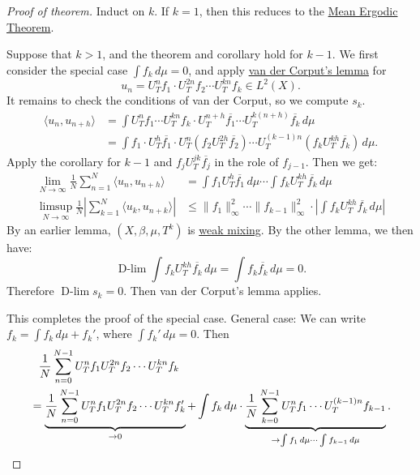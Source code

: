 \documentclass{article}
\DeclareMathOperator*{\dlim}{D-lim}
\begin{document}
\begin{proof}[Proof of theorem]
  Induct on $k$.
  If $k=1$, then this reduces to the \hyperlink{thm:meanet}{Mean Ergodic Theorem}.

  Suppose that $k > 1$, and the theorem and corollary hold for $k-1$.
  We first consider the special case $\int f_k \, d\mu = 0$, and apply \hyperlink{lem:vdC}{van der Corput's lemma} for
  \begin{equation*}
    u_n = U_T^n f_1 \cdot U_T^{2n} f_2 \dotsm U_T^{kn} f_k \in L^2(X).
  \end{equation*}
  It remains to check the conditions of van der Corput, so we compute $s_k$.
  \begin{align*}
    \langle u_n, u_{n+h} \rangle &= \int U_T^n f_1 \dotsm U_T^{kn} f_k \cdot U_T^{n+h} \overline{f_1} \dotsm U_T^{k(n+h)} \overline{f_k} \, d\mu \\
                                 &= \int f_1 \cdot U_T^h \overline{f_1} \cdot U_T^n(f_2 U_T^{2h} \overline{f_2}) \dotsm U_T^{(k-1) n} (f_k U_T^{kh} \overline{f_k}) \, d\mu.
  \end{align*}
  Apply the corollary for $k-1$ and $f_j U_T^{jk} \overline{f_j}$ in the role of $f_{j-1}$.
  Then we get:
  \begin{align*}
    \lim_{N \to \infty} \frac{1}{N} \sum_{n=1}^N \langle u_n, u_{n+h} \rangle &= \int f_1 U_T^h \overline{f_1} \, d\mu \dotsm \int f_k U_T^{kh} \overline{f_k} \, d\mu \\
    \limsup_{N \to \infty} \frac{1}{N} \left|\sum_{k=1}^N \langle u_k, u_{n+k} \rangle \right| &\leq \|f_1\|^2_\infty \dotsm \|f_{k-1}\|^2_\infty \cdot \left|\int f_k U_T^{kh} \overline{f_k} \, d\mu\right|
  \end{align*}
  By an earlier lemma, $(X, \beta, \mu, T^k)$ is \hyperlink{def:wMixing}{weak mixing}.
  By the other lemma, we then have:
  \begin{equation*}
    \dlim \int f_k U_T^{kh} \overline{f_k} \, d\mu = \int f_k \overline{f_k} \,d\mu = 0.
  \end{equation*}
  Therefore $\dlim s_k = 0$.
  Then van der Corput's lemma applies.

  This completes the proof of the special case.
  General case: We can write $f_k = \int f_k \, d\mu + f_k'$, where $\int f_k' \, d\mu = 0$.
  Then
  \begin{align*}
    &\phantom{=}\frac{1}{N} \sum_{n=0}^{N-1} U_T^n f_1 U_T^{2n} f_2 \dotsm U_T^{kn} f_k  \\
    &= \underbrace{\frac{1}{N} \sum_{n=0}^{N-1} U_T^n f_1 U_T^{2n} f_2 \dotsm U_T^{kn} f_k'}_{\to 0} + \int f_k \, d\mu \cdot \underbrace{\frac{1}{N} \sum_{k=0}^{N-1} U_T^n f_1 \dotsm U_T^{(k-1)n} f_{k-1}}_{\to \int f_1 \, d\mu \dotsm \int f_{k-1} \, d\mu}. \qedhere
  \end{align*}
\end{proof}
\end{document}
